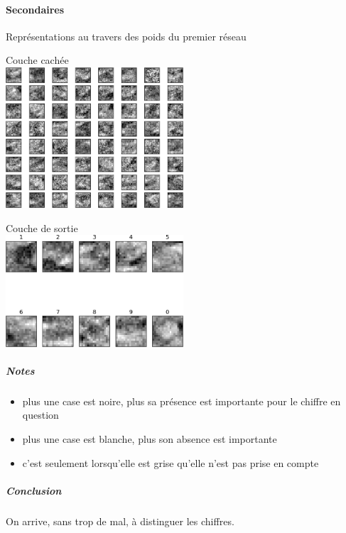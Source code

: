     \paragraph{Secondaires}
      Représentations au travers des poids du premier réseau
      \begin{center}
	Couche cachée \\
	\includegraphics[width=250px]{data/expA3/representation_hidden.png}
      \end{center}
      \begin{center}
	Couche de sortie \\
	\includegraphics[width=250px]{data/expA3/representation.png}
      \end{center} 
      \subparagraph{Notes}
	\begin{itemize}
	  \item plus une case est noire, plus sa présence est importante pour le chiffre en question
	  \item plus une case est blanche, plus son absence est importante
	  \item c'est seulement lorsqu'elle est grise qu'elle n'est pas prise en compte
	\end{itemize}
      \subparagraph{Conclusion}
	On arrive, sans trop de mal, à distinguer les chiffres.
